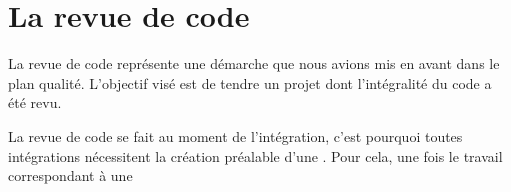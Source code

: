 \section{La revue de code}
La revue de code représente une démarche que nous avions mis en avant dans le plan qualité. L'objectif visé est de tendre un projet dont l'intégralité du code a été revu. 

La revue de code se fait au moment de l'intégration, c'est pourquoi toutes intégrations nécessitent la création préalable d'une \PullRequest. Pour cela, une fois le travail correspondant à une 